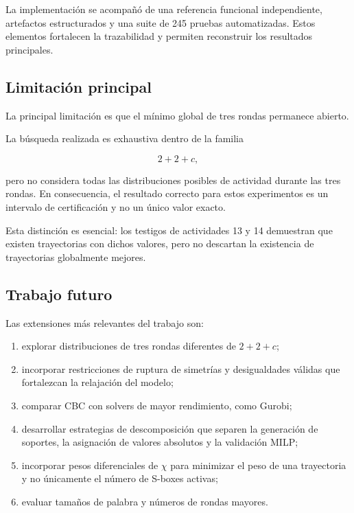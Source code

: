 La implementación se acompañó de una referencia funcional independiente,
artefactos estructurados y una suite de 245 pruebas automatizadas. Estos
elementos fortalecen la trazabilidad y permiten reconstruir los resultados
principales.


\subsection{Limitación principal}
\label{subsec:conclusion_limitacion}

La principal limitación es que el mínimo global de tres rondas permanece
abierto.

La búsqueda realizada es exhaustiva dentro de la familia

\[
2+2+c,
\]

pero no considera todas las distribuciones posibles de actividad durante
las tres rondas. En consecuencia, el resultado correcto para estos
experimentos es un intervalo de certificación y no un único valor exacto.

Esta distinción es esencial: los testigos de actividades 13 y 14 demuestran
que existen trayectorias con dichos valores, pero no descartan la existencia
de trayectorias globalmente mejores.


\subsection{Trabajo futuro}
\label{subsec:trabajo_futuro}

Las extensiones más relevantes del trabajo son:

\begin{enumerate}
    \item explorar distribuciones de tres rondas diferentes de
    $2+2+c$;

    \item incorporar restricciones de ruptura de simetrías y desigualdades
    válidas que fortalezcan la relajación del modelo;

    \item comparar CBC con solvers de mayor rendimiento, como Gurobi;

    \item desarrollar estrategias de descomposición que separen la
    generación de soportes, la asignación de valores absolutos y la
    validación MILP;

    \item incorporar pesos diferenciales de $\chi$ para minimizar el peso
    de una trayectoria y no únicamente el número de S-boxes activas;

    \item evaluar tamaños de palabra y números de rondas mayores.
\end{enumerate}


